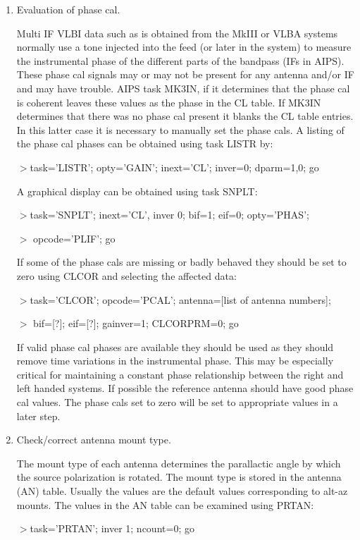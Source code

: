 \begin{enumerate}

\item Evaluation of phase cal.

   Multi IF VLBI data such as is obtained from the MkIII or VLBA
systems normally use a tone injected into the feed (or later in the
system) to measure the instrumental phase of the different parts of
the bandpass (IFs in AIPS).  These phase cal signals may or may not be
present for any antenna and/or IF and may have trouble.  AIPS task
MK3IN, if it determines that the phase cal is coherent leaves these
values as the phase in the CL table.  If MK3IN determines that there
was no phase cal present it blanks the CL table entries.  In this
latter case it is necessary to manually set the phase cals.  A listing
of the phase cal phases can be obtained using task LISTR by:
\par\noindent
$>$task='LISTR'; opty='GAIN'; inext='CL'; inver=0; dparm=1,0; go
\par\noindent
A graphical display can be obtained using task SNPLT:
\par\noindent
$>$task='SNPLT'; inext='CL', inver 0; bif=1; eif=0; opty='PHAS';
\par\noindent
$>$ opcode='PLIF'; go

   If some of the phase cals are missing or badly behaved they should
be set to zero using CLCOR and selecting the affected data:
\par\noindent
$>$task='CLCOR'; opcode='PCAL'; antenna=[list of antenna numbers];
\par\noindent
$>$ bif=[?]; eif=[?]; gainver=1; CLCORPRM=0; go
\par\noindent

   If valid phase cal phases are available they should be used as they
should remove time variations in the instrumental phase.  This may be
especially critical for maintaining a constant phase relationship
between the right and left handed systems.  If possible the reference
antenna should have good phase cal values.  The phase cals set to zero
will be set to appropriate values in a later step.

\vfil\eject
\item Check/correct antenna mount type.

   The mount type of each antenna determines the parallactic angle by
which the source polarization is rotated.  The mount type is stored in
the antenna (AN) table.  Usually the values are the default values
corresponding to alt-az mounts.  The values in the AN table can be
examined using PRTAN:
\par\noindent
$>$task='PRTAN'; inver 1; ncount=0; go


\end{enumerate}
